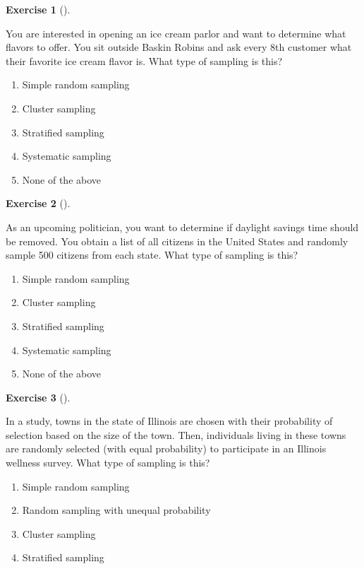\documentclass[
  letterpaper,
  DIV=11,
  numbers=noendperiod]{scrreprt}
\providecommand{\tightlist}{%
  \setlength{\itemsep}{0pt}\setlength{\parskip}{0pt}}\usepackage{longtable,booktabs,array}
\theoremstyle{definition}
\newtheorem{exercise}{Exercise}[chapter]
\theoremstyle{remark}
\begin{document}
\begin{exercise}[]\protect\hypertarget{exr-ch08-c05}{}\label{exr-ch08-c05}

You are interested in opening an ice cream parlor and want to determine
what flavors to offer. You sit outside Baskin Robins and ask every 8th
customer what their favorite ice cream flavor is. What type of sampling
is this?

\begin{enumerate}
\def\labelenumi{\alph{enumi})}
\tightlist
\item
  Simple random sampling
\item
  Cluster sampling
\item
  Stratified sampling
\item
  Systematic sampling
\item
  None of the above
\end{enumerate}

\end{exercise}

\begin{exercise}[]\protect\hypertarget{exr-ch08-c06}{}\label{exr-ch08-c06}

As an upcoming politician, you want to determine if daylight savings
time should be removed. You obtain a list of all citizens in the United
States and randomly sample 500 citizens from each state. What type of
sampling is this?

\begin{enumerate}
\def\labelenumi{\alph{enumi})}
\tightlist
\item
  Simple random sampling
\item
  Cluster sampling
\item
  Stratified sampling
\item
  Systematic sampling
\item
  None of the above
\end{enumerate}

\end{exercise}

\begin{exercise}[]\protect\hypertarget{exr-ch08-c07}{}\label{exr-ch08-c07}

In a study, towns in the state of Illinois are chosen with their
probability of selection based on the size of the town. Then,
individuals living in these towns are randomly selected (with equal
probability) to participate in an Illinois wellness survey. What type of
sampling is this?

\begin{enumerate}
\def\labelenumi{\alph{enumi})}
\tightlist
\item
  Simple random sampling
\item
  Random sampling with unequal probability
\item
  Cluster sampling
\item
  Stratified sampling
\end{enumerate}

\end{exercise}
\end{document}
